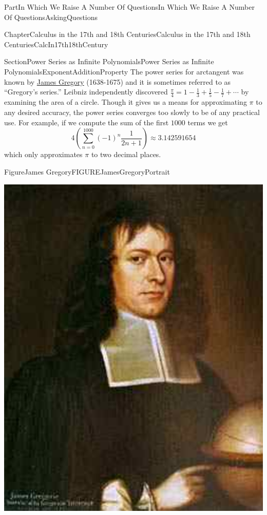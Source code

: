 \documentclass[oneside,10pt,]{book}
\numberwithin{equation}{part}
\begin{document}
\begin{partptx}{Part}{In Which We Raise A Number Of Questions}{}{In Which We Raise A Number Of Questions}{}{}{AskingQuestions}
\begin{chapterptx}{Chapter}{Calculus in the 17th and 18th Centuries}{}{Calculus in the 17th and 18th Centuries}{}{}{CalcIn17th18thCentury}
\begin{sectionptx}{Section}{Power Series as Infinite Polynomials}{}{Power Series as Infinite Polynomials}{}{}{ExponentAdditionProperty}
 The power series for arctangent was known by \href{https://mathshistory.st-andrews.ac.uk/Biographies/Gregory/}{James Gregory} (1638-1675) and it is sometimes referred to as ``Gregory's series.'' Leibniz independently discovered \(\frac{\pi}{4}=1-\frac{1}{3}+\frac{1}{5}-\frac{1}{7}+\cdots\) by examining the area of a circle.  Though it gives us a means for approximating \(\pi\) to any desired accuracy, the power series converges too slowly to be of any practical use.  For example, if we compute the sum of the first \(1000\) terms we get%
\begin{equation*}
4\left(\sum_{n=0}^{1000}(-1)^n\frac{1}{2n+1}\right)\approx 3.142591654
\end{equation*}
which only approximates \(\pi\) to two decimal places.%
\begin{figureptx}{Figure}{James Gregory}{FIGUREJamesGregoryPortrait}{}%
%
%
\begin{image}{0.325}{0.35}{0.325}{}%
\includegraphics[width=\linewidth]{external/images/JamesGregory.png}

\end{image}
\end{figureptx}
\end{sectionptx}
\end{chapterptx}
\end{partptx}
\end{document}
